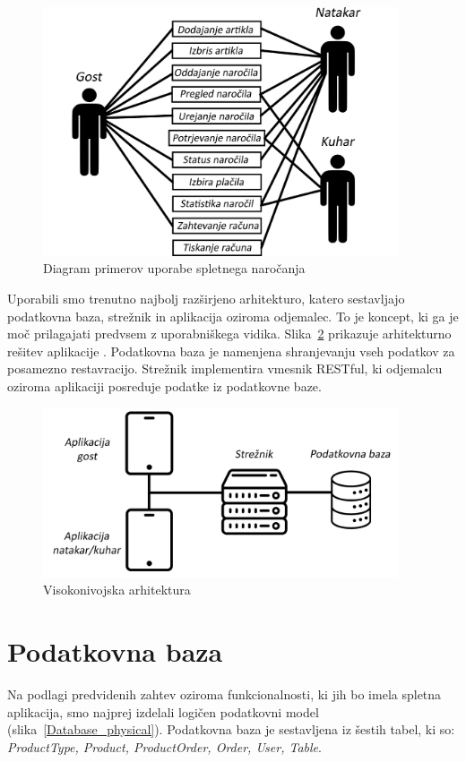 \documentclass[a4paper, 12pt]{book}
\begin{document}
\begin{figure}[!htb]
\begin{center}
\includegraphics[width=10.5cm]{Skica2.png}
\caption{Diagram primerov uporabe spletnega naročanja}
\label{FunkVloge}
\end{center}
\end{figure}

Uporabili smo trenutno najbolj razširjeno arhitekturo, katero sestavljajo podatkovna baza, strežnik in aplikacija oziroma odjemalec. To je koncept, ki ga je moč prilagajati predvsem z uporabniškega vidika. Slika~\ref{StrukApk} prikazuje arhitekturno rešitev aplikacije \cite{TRINIVO}.
Podatkovna baza je namenjena shranjevanju vseh podatkov za posamezno restavracijo. Strežnik implementira vmesnik RESTful, ki odjemalcu oziroma aplikaciji posreduje podatke iz podatkovne baze. 

\begin{figure}[!htb]
\centering
\includegraphics[width=10.5cm]{Skica1-new.png}
\caption{Visokonivojska arhitektura}
\label{StrukApk}
\end{figure}


\section{Podatkovna baza}
Na podlagi predvidenih zahtev oziroma funkcionalnosti, ki jih bo imela spletna aplikacija, smo najprej izdelali logičen podatkovni model (slika~\ref{Database_physical}). Podatkovna baza je sestavljena iz šestih tabel, ki so: \textit{ProductType, Product, ProductOrder, Order, User, Table}. 
\end{document}
